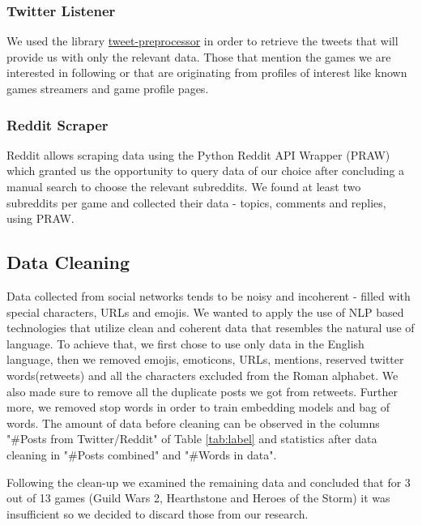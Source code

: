 \subsubsection{Twitter Listener}
We used the library \href{https://pypi.org/project/tweet-preprocessor/}{tweet-preprocessor} in order to retrieve the tweets that will provide us with only the relevant data. Those that mention the games we are interested in following or that are originating from profiles of interest like known games streamers and game profile pages.


\subsubsection{Reddit Scraper}
Reddit allows scraping data using the Python Reddit API Wrapper (PRAW) which granted us the opportunity to query data of our choice after concluding a manual search to choose the relevant subreddits. We found at least two subreddits per game and collected their data - topics, comments and replies, using PRAW.


\subsection{Data Cleaning}
Data collected from social networks tends to be noisy and incoherent - filled with special characters, URLs and emojis.
We wanted to apply the use of NLP based technologies that utilize clean and coherent data that resembles the natural use of language. To achieve that, we first chose to use only data in the English language, then we removed emojis, emoticons, URLs, mentions, reserved twitter words(retweets) and all the characters excluded from the Roman alphabet. We also made sure to remove all the duplicate posts we got from retweets. Further more, we removed stop words in order to train embedding models and bag of words. 
The amount of data before cleaning can be observed in the columns "\#Posts from Twitter/Reddit" of Table \ref{tab:label} and statistics after data cleaning in "\#Posts combined" and "\#Words in data".

Following the clean-up we examined the remaining data and concluded that for 3 out of 13 games (Guild Wars 2, Hearthstone and Heroes of the Storm) it was insufficient so we decided to discard those from our research. 
